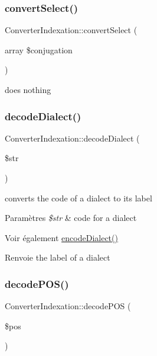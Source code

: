 \subsubsection{\texorpdfstring{convert\+Select()}{convertSelect()}}
{\footnotesize\ttfamily Converter\+Indexation\+::convert\+Select (\begin{DoxyParamCaption}\item[{array}]{\$conjugation }\end{DoxyParamCaption})}

does nothing \hypertarget{classConverterIndexation_a138e9e08f03d5a14fc53d367c9c739de}{}\label{classConverterIndexation_a138e9e08f03d5a14fc53d367c9c739de} 
\subsubsection{\texorpdfstring{decode\+Dialect()}{decodeDialect()}}
{\footnotesize\ttfamily Converter\+Indexation\+::decode\+Dialect (\begin{DoxyParamCaption}\item[{}]{\$str }\end{DoxyParamCaption})}



converts the code of a dialect to its label 


\begin{DoxyParams}{Paramètres}
{\em \$str} & code for a dialect \\
\hline
\end{DoxyParams}
\begin{DoxySeeAlso}{Voir également}
\hyperlink{classConverterIndexation_ab9501f7ab3dad7daa338023522f03949}{encode\+Dialect()} 
\end{DoxySeeAlso}
\begin{DoxyReturn}{Renvoie}
the label of a dialect 
\end{DoxyReturn}
\hypertarget{classConverterIndexation_a6012e4df4619a7cc1c55c811fc50690d}{}\label{classConverterIndexation_a6012e4df4619a7cc1c55c811fc50690d} 
\subsubsection{\texorpdfstring{decode\+P\+O\+S()}{decodePOS()}}
{\footnotesize\ttfamily Converter\+Indexation\+::decode\+P\+OS (\begin{DoxyParamCaption}\item[{}]{\$pos }\end{DoxyParamCaption})}



